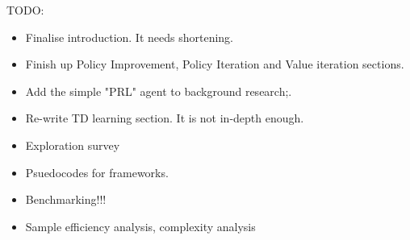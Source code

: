 TODO:
\begin{itemize}
    \item Finalise introduction. It needs shortening.
    \item Finish up Policy Improvement, Policy Iteration and Value iteration sections.
    \item Add the simple "PRL" agent to background research;.
    \item Re-write TD learning section. It is not in-depth enough.
    \item Exploration survey
    \item Psuedocodes for frameworks.
    \item Benchmarking!!!
    \item Sample efficiency analysis, complexity analysis
\end{itemize}